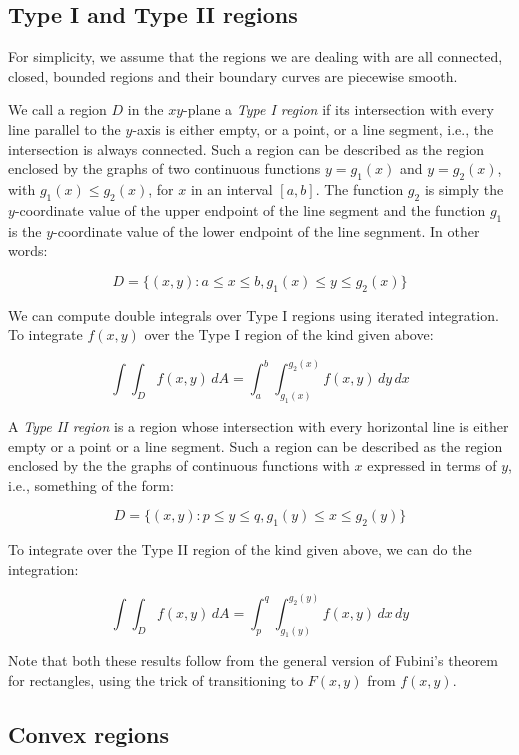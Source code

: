 \documentclass[10pt]{amsart}
\begin{document}
\subsection{Type I and Type II regions}

For simplicity, we assume that the regions we are dealing with are all
connected, closed, bounded regions and their boundary curves are
piecewise smooth.

We call a region $D$ in the $xy$-plane a {\em Type I region} if its
intersection with every line parallel to the $y$-axis is either empty,
or a point, or a line segment, i.e., the intersection is always
connected. Such a region can be described as the region enclosed by
the graphs of two continuous functions $y = g_1(x)$ and $y = g_2(x)$,
with $g_1(x) \le g_2(x)$, for $x$ in an interval $[a,b]$. The function
$g_2$ is simply the $y$-coordinate value of the upper endpoint of the
line segment and the function $g_1$ is the $y$-coordinate value of the
lower endpoint of the line segnment. In other words:

$$D = \{ (x,y) : a \le x \le b, g_1(x) \le y \le g_2(x)\}$$

We can compute double integrals over Type I regions using iterated
integration. To integrate $f(x,y)$ over the Type I region of the kind
given above:

$$\int \int_D f(x,y) \, dA = \int_a^b \int_{g_1(x)}^{g_2(x)} f(x,y) \, dy \, dx$$

A {\em Type II region} is a region whose intersection with every
horizontal line is either empty or a point or a line segment. Such a
region can be described as the region enclosed by the the graphs of
continuous functions with $x$ expressed in terms of $y$, i.e., something of the form:

$$D = \{ (x,y) : p \le y \le q, g_1(y) \le x \le g_2(y) \}$$

To integrate over the Type II region of the kind given above, we can
do the integration:

$$\int \int_D f(x,y) \, dA = \int_p^q \int_{g_1(y)}^{g_2(y)} f(x,y) \, dx \, dy$$

Note that both these results follow from the general version of
Fubini's theorem for rectangles, using the trick of transitioning to
$F(x,y)$ from $f(x,y)$.

\subsection{Convex regions}
\end{document}
